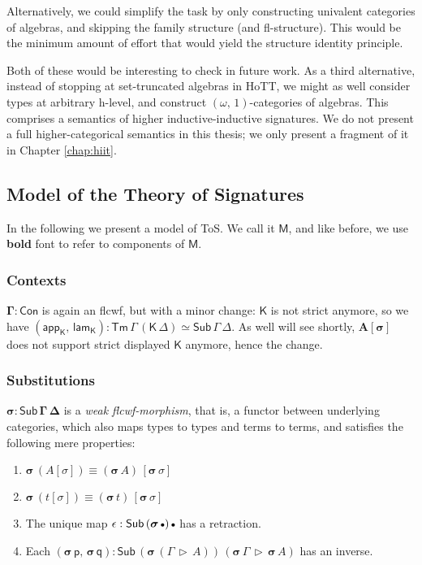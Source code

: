 \documentclass[12pt,a4paper,twoside,openany]{book}
\theoremstyle{remark}
\theoremstyle{definition}
\theoremstyle{theorem}
\newcommand{\bs}[1]{\boldsymbol{#1}}
\newcommand{\Con}{\mathsf{Con}}
\newcommand{\Sub}{\mathsf{Sub}}
\newcommand{\Tm}{\mathsf{Tm}}
\newcommand{\ext}{\triangleright}
\newcommand{\emptycon}{\scaleobj{.75}\bullet}
\newcommand{\lamK}{\mathsf{lam}_{\K}}
\newcommand{\appK}{\mathsf{app}_{\K}}
\newcommand{\p}{\mathsf{p}}
\newcommand{\q}{\mathsf{q}}
\newcommand{\K}{\mathsf{K}}
\newcommand{\bCon}{\bs{\Con}}
\newcommand{\bGamma}{\bs{\Gamma}}
\newcommand{\bsigma}{\bs{\sigma}}
\newcommand{\bM}{\bs{\mathsf{M}}}
\begin{document}
Alternatively, we could simplify the task by only constructing univalent
categories of algebras, and skipping the family structure (and
fl-structure). This would be the minimum amount of effort that would yield the
structure identity principle.

Both of these would be interesting to check in future work. As a third
alternative, instead of stopping at set-truncated algebras in HoTT, we might as
well consider types at arbitrary h-level, and construct
$(\omega,\,1)$-categories of algebras. This comprises a semantics of higher
inductive-inductive signatures. We do not present a full higher-categorical
semantics in this thesis; we only present a fragment of it in Chapter
\ref{chap:hiit}.

\subsection{Model of the Theory of Signatures}

In the following we present a model of ToS. We call it $\bM$, and like before,
we use \textbf{bold} font to refer to components of $\bM$.

\subsubsection{Contexts}

$\bGamma : \bCon$ is again an flcwf, but with a minor change: $\K$ is not strict
anymore, so we have $(\appK,\,\lamK) : \Tm\,\Gamma\,(\K\,\Delta) \simeq
\Sub\,\Gamma\,\Delta$. As well will see shortly, $\bs{A[\sigma]}$ does not
support strict displayed $\K$ anymore, hence the change.

\subsubsection{Substitutions}
\label{sec:iqiit-substitutions}

$\bs{\sigma : \Sub\,\Gamma\,\Delta}$ is a \emph{weak flcwf-morphism}, that is, a
functor between underlying categories, which also maps types to types and terms
to terms, and satisfies the following mere properties:
  \begin{enumerate}
    \item $\bsigma\,(A[\sigma]) \equiv (\bsigma\,A)\,[\bsigma\,\sigma]$
    \item $\bsigma\,(t[\sigma]) \equiv (\bsigma\,t)\,[\bsigma\,\sigma]$
    \item The unique map $\epsilon : \Sub\,(\bsigma\,\emptycon)\,\emptycon$ has a retraction.
    \item Each $(\bsigma\,\p,\,\bsigma\,\q) : \Sub\,(\bsigma\,(\Gamma\,\ext\,A))\,(\bsigma\,\Gamma\,\ext\,\bsigma\,A)$ has an inverse.
  \end{enumerate}
\end{document}
